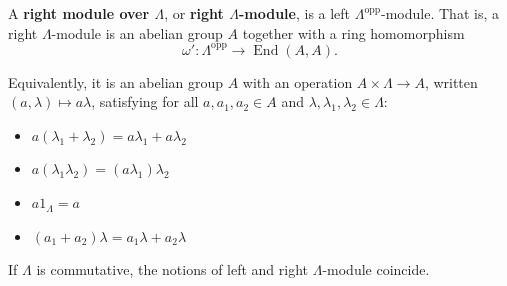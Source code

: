 A \textbf{right module over $\Lambda$}, or \textbf{right $\Lambda$-module}, is a left $\Lambda^{\mathrm{opp}}$-module. That is, a right $\Lambda$-module is an abelian group $A$ together with a ring homomorphism
$$\omega' : \Lambda^{\mathrm{opp}} \to \operatorname{End}(A, A).$$

Equivalently, it is an abelian group $A$ with an operation $A \times \Lambda \to A$, written $(a, \lambda) \mapsto a\lambda$, satisfying for all $a, a_1, a_2 \in A$ and $\lambda, \lambda_1, \lambda_2 \in \Lambda$:

\begin{itemize}
  \item[\textbf{M 1$'$:}] $a(\lambda_1 + \lambda_2) = a\lambda_1 + a\lambda_2$
  \item[\textbf{M 2$'$:}] $a(\lambda_1 \lambda_2) = (a\lambda_1)\lambda_2$
  \item[\textbf{M 3$'$:}] $a 1_{\Lambda} = a$
  \item[\textbf{M 4$'$:}] $(a_1 + a_2)\lambda = a_1\lambda + a_2\lambda$
\end{itemize}

If $\Lambda$ is commutative, the notions of left and right $\Lambda$-module coincide.

